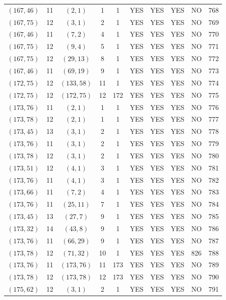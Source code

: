 \begin{longtable}{|c|c|c|c|c|c|c|c|c|c|}
$(167, 46)$ & 11 & $(2, 1)$ & 1 & 1 & YES & YES & YES & NO & 768\\
$(167, 75)$ & 12 & $(3, 1)$ & 2 & 1 & YES & YES & YES & NO & 769\\
$(167, 46)$ & 11 & $(7, 2)$ & 4 & 1 & YES & YES & YES & NO & 770\\
$(167, 75)$ & 12 & $(9, 4)$ & 5 & 1 & YES & YES & YES & NO & 771\\
$(167, 75)$ & 12 & $(29, 13)$ & 8 & 1 & YES & YES & YES & NO & 772\\
$(167, 46)$ & 11 & $(69, 19)$ & 9 & 1 & YES & YES & YES & NO & 773\\
$(172, 75)$ & 12 & $(133, 58)$ & 11 & 1 & YES & YES & YES & NO & 774\\
$(172, 75)$ & 12 & $(172, 75)$ & 12 & 172 & YES & YES & YES & NO & 775\\
$(173, 76)$ & 11 & $(2, 1)$ & 1 & 1 & YES & YES & YES & NO & 776\\
$(173, 78)$ & 12 & $(2, 1)$ & 1 & 1 & YES & YES & YES & NO & 777\\
$(173, 45)$ & 13 & $(3, 1)$ & 2 & 1 & YES & YES & YES & NO & 778\\
$(173, 76)$ & 11 & $(3, 1)$ & 2 & 1 & YES & YES & YES & NO & 779\\
$(173, 78)$ & 12 & $(3, 1)$ & 2 & 1 & YES & YES & YES & NO & 780\\
$(173, 51)$ & 12 & $(4, 1)$ & 3 & 1 & YES & YES & YES & NO & 781\\
$(173, 76)$ & 11 & $(4, 1)$ & 3 & 1 & YES & YES & YES & NO & 782\\
$(173, 66)$ & 11 & $(7, 2)$ & 4 & 1 & YES & YES & YES & NO & 783\\
$(173, 76)$ & 11 & $(25, 11)$ & 7 & 1 & YES & YES & YES & NO & 784\\
$(173, 45)$ & 13 & $(27, 7)$ & 9 & 1 & YES & YES & YES & NO & 785\\
$(173, 32)$ & 14 & $(43, 8)$ & 9 & 1 & YES & YES & YES & NO & 786\\
$(173, 76)$ & 11 & $(66, 29)$ & 9 & 1 & YES & YES & YES & NO & 787\\
$(173, 78)$ & 12 & $(71, 32)$ & 10 & 1 & YES & YES & YES & 826 & 788\\
$(173, 76)$ & 11 & $(173, 76)$ & 11 & 173 & YES & YES & YES & NO & 789\\
$(173, 78)$ & 12 & $(173, 78)$ & 12 & 173 & YES & YES & YES & NO & 790\\
$(175, 62)$ & 12 & $(3, 1)$ & 2 & 1 & YES & YES & YES & NO & 791\\

\end{longtable}

